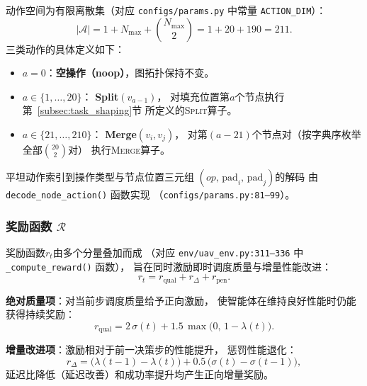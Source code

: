 动作空间为有限离散集（对应 \texttt{configs/params.py} 中常量
\texttt{ACTION\_DIM}）：
\begin{equation}
  |\mathcal{A}| = 1 + N_{\max} + \binom{N_{\max}}{2}
               = 1 + 20 + 190 = 211.
  \label{eq:action_dim}
\end{equation}
三类动作的具体定义如下：
\begin{itemize}[leftmargin=*, itemsep=2pt]
  \item $a = 0$：\textbf{空操作（noop）}，图拓扑保持不变。
  \item $a \in \{1,\ldots,20\}$：
        \textbf{Split$(v_{a-1})$}，
        对填充位置第$a$个节点执行第~\ref{subsec:task_shaping}节
        所定义的\textsc{Split}算子。
  \item $a \in \{21,\ldots,210\}$：
        \textbf{Merge$(v_i, v_j)$}，
        对第$(a-21)$个节点对（按字典序枚举全部$\binom{20}{2}$对）
        执行\textsc{Merge}算子。
\end{itemize}
平坦动作索引到操作类型与节点位置三元组
$(op,\, \text{pad}_i,\, \text{pad}_j)$的解码
由 \texttt{decode\_node\_action()} 函数实现
（\texttt{configs/params.py:81--99}）。

\subsubsection*{奖励函数 $\mathcal{R}$}

奖励函数$r_t$由多个分量叠加而成
（对应 \texttt{env/uav\_env.py:311--336}
中 \texttt{\_compute\_reward()} 函数），
旨在同时激励即时调度质量与增量性能改进：
\begin{equation}
  r_t = r_{\text{qual}} + r_{\Delta} + r_{\text{pen}}.
  \label{eq:reward}
\end{equation}

\noindent\textbf{绝对质量项}：对当前步调度质量给予正向激励，
使智能体在维持良好性能时仍能获得持续奖励：
\begin{equation}
  r_{\text{qual}} = 2\,\sigma(t) + 1.5\,\max\!\bigl(0,\, 1 - \lambda(t)\bigr).
  \label{eq:reward_qual}
\end{equation}

\noindent\textbf{增量改进项}：激励相对于前一决策步的性能提升，
惩罚性能退化：
\begin{equation}
  r_{\Delta} = \bigl(\lambda(t-1) - \lambda(t)\bigr)
             + 0.5\,\bigl(\sigma(t) - \sigma(t-1)\bigr),
  \label{eq:reward_delta}
\end{equation}
延迟比降低（延迟改善）和成功率提升均产生正向增量奖励。

